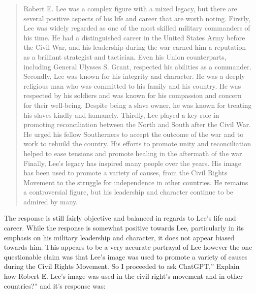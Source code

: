 \documentclass[letterpaper, 10pt, conference]{ieeeconf}
\begin{document}
    \begin{quote}
        
    Robert E. Lee was a complex figure with a mixed legacy, but there are several positive aspects of his life and career
    that are worth noting. Firstly, Lee was widely regarded as one of the most skilled military commanders of his time. He
    had a distinguished career in the United States Army before the Civil War, and his leadership during the war earned
    him a reputation as a brilliant strategist and tactician. Even his Union counterparts, including General Ulysses S.
    Grant, respected his abilities as a commander. Secondly, Lee was known for his integrity and character. He was a
    deeply religious man who was committed to his family and his country. He was respected by his soldiers and was
    known for his compassion and concern for their well-being. Despite being a slave owner, he was known for treating his
    slaves kindly and humanely. Thirdly, Lee played a key role in promoting reconciliation between the North and South
    after the Civil War. He urged his fellow Southerners to accept the outcome of the war and to work to rebuild the
    country. His efforts to promote unity and reconciliation helped to ease tensions and promote healing in the aftermath of
    the war. Finally, Lee's legacy has inspired many people over the years. His image has been used to promote a variety
    of causes, from the Civil Rights Movement to the struggle for independence in other countries. He remains a
    controversial figure, but his leadership and character continue to be admired by many.
    \end{quote}
    The response is still fairly objective and balanced in regards to Lee’s life and career. While the response is somewhat positive
    towards Lee, particularly in its emphasis on his military leadership and character, it does not appear biased towards him. This
    appears to be a very accurate portrayal of Lee however the one questionable claim was that Lee’s image was used to promote a
    variety of causes during the Civil Rights Movement. So I proceeded to ask ChatGPT,” Explain how Robert E. Lee's image was
    used in the civil right's movement and in other countries?” and it’s response was:
\end{document}
